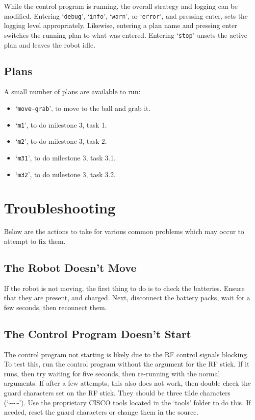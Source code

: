 \documentclass[a4paper,12pt]{scrartcl}
\begin{document}
While the control program is running, the overall strategy and logging can be
modified. Entering `\texttt{debug}', `\texttt{info}', `\texttt{warn}', or
`\texttt{error}', and pressing enter, sets the logging level appropriately.
Likewise, entering a plan name and pressing enter switches the running plan to
what was entered. Entering `\texttt{stop}' unsets the active plan and leaves
the robot idle.

\pagebreak

\subsection{Plans}

A small number of plans are available to run:

\begin{itemize}
    \item `\texttt{move-grab}', to move to the ball and grab it.
    \item `\texttt{m1}', to do milestone 3, task 1.
    \item `\texttt{m2}', to do milestone 3, task 2.
    \item `\texttt{m31}', to do milestone 3, task 3.1.
    \item `\texttt{m32}', to do milestone 3, task 3.2.
\end{itemize}

%

\section{Troubleshooting}

Below are the actions to take for various common problems which may occur to
attempt to fix them.

\subsection{The Robot Doesn't Move}

If the robot is not moving, the first thing to do is to check the batteries.
Ensure that they are present, and charged. Next, disconnect the battery packs,
wait for a few seconds, then reconnect them.

\subsection{The Control Program Doesn't Start}

The control program not starting is likely due to the RF control signals
blocking. To test this, run the control program without the argument for the RF
stick. If it runs, then try waiting for five seconds, then re-running with the
normal arguments. If after a few attempts, this also does not work, then double
check the guard characters set on the RF stick. They should be three tilde
characters (`\verb$~~~$'). Use the proprietary CISCO tools located in the
`tools' folder to do this. If needed, reset the guard characters or change them
in the source.
\end{document}
